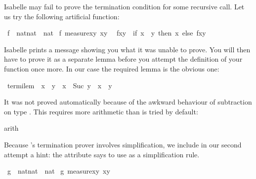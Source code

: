 \begin{isabellebody}
\begin{isamarkuptext}
Isabelle may fail to prove the termination condition for some
recursive call.  Let us try the following artificial function:%
\end{isamarkuptext}%
\isamarkuptrue%
\ f\ {\isacharcolon}{\isacharcolon}\ {\isachardoublequote}nat{\isasymtimes}nat\ {\isasymRightarrow}\ nat{\isachardoublequote}\isanewline
\isamarkupfalse%
\ f\ {\isachardoublequote}measure{\isacharparenleft}{\isasymlambda}{\isacharparenleft}x{\isacharcomma}y{\isacharparenright}{\isachardot}\ x{\isacharminus}y{\isacharparenright}{\isachardoublequote}\isanewline
\ \ {\isachardoublequote}f{\isacharparenleft}x{\isacharcomma}y{\isacharparenright}\ {\isacharequal}\ {\isacharparenleft}if\ x\ {\isasymle}\ y\ then\ x\ else\ f{\isacharparenleft}x{\isacharcomma}y{\isacharplus}{}{\isacharparenright}{\isacharparenright}{\isachardoublequote}\isamarkupfalse%
%
\begin{isamarkuptext}%
\noindent
Isabelle prints a
message showing you what it was unable to prove. You will then
have to prove it as a separate lemma before you attempt the definition
of your function once more. In our case the required lemma is the obvious one:%
\end{isamarkuptext}%
\isamarkuptrue%
\ termi{\isacharunderscore}lem{\isacharcolon}\ {\isachardoublequote}{\isasymnot}\ x\ {\isasymle}\ y\ {\isasymLongrightarrow}\ x\ {\isacharminus}\ Suc\ y\ {\isacharless}\ x\ {\isacharminus}\ y{\isachardoublequote}\isamarkupfalse%
%
\begin{isamarkuptxt}%
\noindent
It was not proved automatically because of the awkward behaviour of subtraction
on type . This requires more arithmetic than is tried by default:%
\end{isamarkuptxt}%
\isamarkuptrue%
arith{\isacharparenright}\isanewline
\isamarkupfalse%
\isamarkupfalse%
%
\begin{isamarkuptext}%
\noindent
Because 's termination prover involves simplification,
we include in our second attempt a hint: the  attribute 
says to use  as
a simplification rule.%
\end{isamarkuptext}%
\isamarkuptrue%
\ g\ {\isacharcolon}{\isacharcolon}\ {\isachardoublequote}nat{\isasymtimes}nat\ {\isasymRightarrow}\ nat{\isachardoublequote}\isanewline
\isamarkupfalse%
\ g\ {\isachardoublequote}measure{\isacharparenleft}{\isasymlambda}{\isacharparenleft}x{\isacharcomma}y{\isacharparenright}{\isachardot}\ x{\isacharminus}y{\isacharparenright}{\isachardoublequote}\isanewline

\end{isabellebody}
